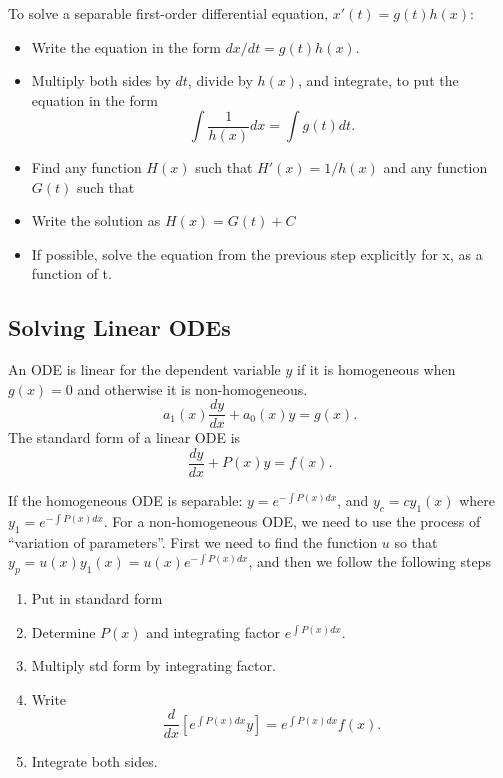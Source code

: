   \begin{theorem}
    To solve a separable first-order differential equation, $x'(t)=g(t)h(x)$:
    \begin{itemize}
      \item Write the equation in the form $dx/dt=g(t)h(x)$.
      \item Multiply both sides by $dt$, divide by $h(x)$, and integrate, to put the equation in the form 
        \[
          \int \frac{1}{h(x)}dx =\int g(t)dt.
        \]
      \item Find any function $H(x)$ such that $H'(x)=1/h(x)$ and any function $G(t)$ such that %
      \item Write the solution as $H(x)=G(t)+C$
      \item If possible, solve the equation from the previous step explicitly for x, as a function of t.
    \end{itemize}
  \end{theorem}

\subsection{Solving Linear ODEs}

 \begin{definition}
   An ODE is linear for the dependent variable $y$ if it is homogeneous when $g(x)=0$ and otherwise it is non-homogeneous.
   \[
     a_1(x)\frac{dy}{dx}+a_0(x)y=g(x)
   .\] 
   The standard form of a linear ODE is
   \[
     \frac{dy}{dx}+P(x)y=f(x)
   .\] 
 \end{definition}
 
 If the homogeneous ODE is separable: $y=e^{-\int P(x)dx}$, and $y_c=cy_1(x)$ where $y_1=e^{-\int P(x)dx}$. For a non-homogeneous ODE, we need to use the process of “variation of parameters”. First we need to find the function $u$ so that $y_p=u(x)y_1(x)=u(x)e^{-\int P(x)dx}$, and then we follow the following steps

 \begin{enumerate}
   \item Put in standard form
   \item Determine $P(x)$ and integrating factor $e^{\int P(x)dx}$.
   \item Multiply std form by integrating factor.
   \item Write \[
       \frac{d}{dx}\left[e^{\int P(x)dx}y\right]=e^{\int P(x)dx}f(x)
   .\] 
  \item Integrate both sides.
 \end{enumerate}

